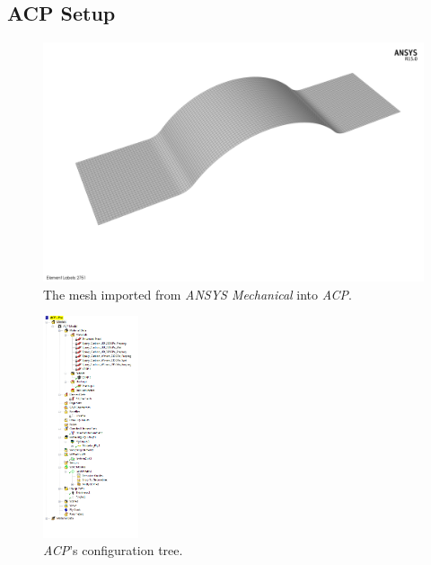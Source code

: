 \clearpage

\subsection{ACP Setup}


\begin{figure}[htp]
\centering
\includegraphics[width=1\textwidth]{./figures/fea/fea-acp-mesh-overview}
\caption{The mesh imported from \textit{ANSYS Mechanical} into \textit{ACP}.}
\label{fig:fea-acp-mesh-overview}
\end{figure}


\begin{figure}[htp]
\centering
\includegraphics[width=0.25\textwidth]{./figures/fea/fea-acp-tree}
\caption{\textit{ACP}'s configuration tree.}
\label{fig:fea-acp-tree}
\end{figure}


